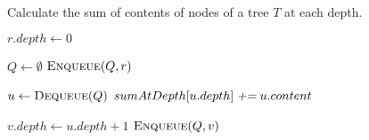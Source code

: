 
\begin{algorithm}[t]
  \caption{Calculate the sum of contents of nodes of a tree $T$ at each depth.}
  \label{alg:sum-at-depth}
  \begin{algorithmic}[1]
     
      \State $r.depth \gets 0$

      \hStatex
      \State $Q \gets \emptyset$
      \State $\Call{Enqueue}{Q, r}$

      \hStatex
	\State $u \gets \Call{Dequeue}{Q}$
	\State $sumAtDepth[u.depth] \textsl{\;+=\;} u.content$

	\hStatex
	  \State $v.depth \gets u.depth + 1$
	  \State $\Call{Enqueue}{Q, v}$
	\EndFor
      \EndWhile
    \EndProcedure
  \end{algorithmic}
\end{algorithm}
